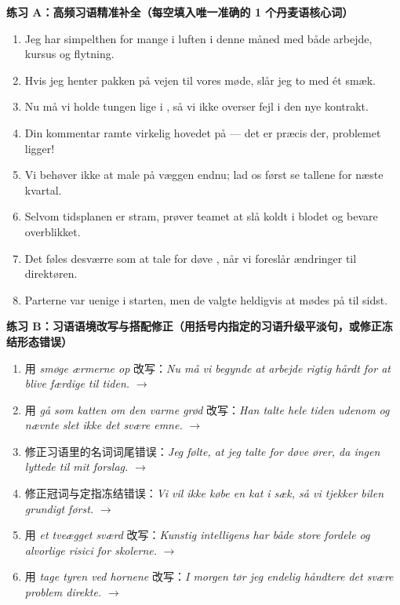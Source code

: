 \textbf{练习 A：高频习语精准补全（每空填入唯一准确的 1 个丹麦语核心词）}
\begin{enumerate}
  \item Jeg har simpelthen for mange \underline{\hspace{2.2cm}} i luften i denne måned med både arbejde, kursus og flytning.
  \item Hvis jeg henter pakken på vejen til vores møde, slår jeg to \underline{\hspace{2.2cm}} med ét smæk.
  \item Nu må vi holde tungen lige i \underline{\hspace{2.2cm}}, så vi ikke overser fejl i den nye kontrakt.
  \item Din kommentar ramte virkelig hovedet på \underline{\hspace{2.2cm}} --- det er præcis der, problemet ligger!
  \item Vi behøver ikke at male \underline{\hspace{2.2cm}} på væggen endnu; lad os først se tallene for næste kvartal.
  \item Selvom tidsplanen er stram, prøver teamet at slå koldt \underline{\hspace{2.2cm}} i blodet og bevare overblikket.
  \item Det føles desværre som at tale for døve \underline{\hspace{2.2cm}}, når vi foreslår ændringer til direktøren.
  \item Parterne var uenige i starten, men de valgte heldigvis at mødes på \underline{\hspace{2.2cm}} til sidst.
\end{enumerate}

\textbf{练习 B：习语语境改写与搭配修正（用括号内指定的习语升级平淡句，或修正冻结形态错误）}
\begin{enumerate}
  \item 用 \textit{smøge ærmerne op} 改写：\textit{Nu må vi begynde at arbejde rigtig hårdt for at blive færdige til tiden.} $\rightarrow$
  \item 用 \textit{gå som katten om den varme grød} 改写：\textit{Han talte hele tiden udenom og nævnte slet ikke det svære emne.} $\rightarrow$
  \item 修正习语里的名词词尾错误：\textit{Jeg følte, at jeg talte for døve ører, da ingen lyttede til mit forslag.} $\rightarrow$
  \item 修正冠词与定指冻结错误：\textit{Vi vil ikke købe en kat i sæk, så vi tjekker bilen grundigt først.} $\rightarrow$
  \item 用 \textit{et tveægget sværd} 改写：\textit{Kunstig intelligens har både store fordele og alvorlige risici for skolerne.} $\rightarrow$
  \item 用 \textit{tage tyren ved hornene} 改写：\textit{I morgen tør jeg endelig håndtere det svære problem direkte.} $\rightarrow$
\end{enumerate}

